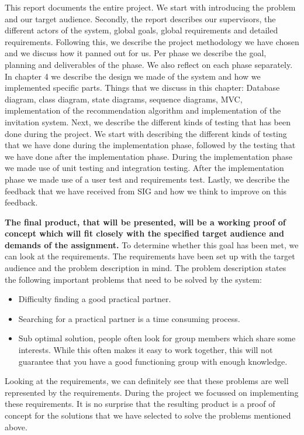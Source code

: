 This report documents the entire project.
We start with introducing the problem and our target audience.
Secondly, the report describes our supervisors, the different actors of the system, global goals, global requirements and detailed requirements.
Following this, we describe the project methodology we have chosen and we discuss how it panned out for us.
Per phase we describe the goal, planning and deliverables of the phase.
We also reflect on each phase separately.
In chapter 4 we describe the design we made of the system and how we implemented specific parts.
Things that we discuss in this chapter: Database diagram, class diagram, state diagrams, sequence diagrams, MVC, implementation of the recommendation algorithm and implementation of the invitation system.
Next, we describe the different kinds of testing that has been done during the project.
We start with describing the different kinds of testing that we have done during the implementation phase, followed by the testing that we have done after the implementation phase.
During the implementation phase we made use of unit testing and integration testing.
After the implementation phase we made use of a user test and requirements test.
Lastly, we describe the feedback that we have received from SIG and how we think to improve on this feedback.

\textbf{The final product, that will be presented, will be a working proof of concept which will fit closely with the specified target audience and demands of the assignment.}
To determine whether this goal has been met, we can look at the requirements.
The requirements have been set up with the target audience and the problem description in mind.
The problem description states the following important problems that need to be solved by the system:
\begin{itemize}
\item Difficulty finding a good practical partner.
\item Searching for a practical partner is a time consuming process.
\item Sub optimal solution, people often look for group members which share some interests.
While this often makes it easy to work together, this will not guarantee that you have a good functioning group with enough knowledge.
\end{itemize}

Looking at the requirements, we can definitely see that these problems are well represented by the requirements.
During the project we focussed on implementing these requirements.
It is no surprise that the resulting product is a proof of concept for the solutions that we have selected to solve the problems mentioned above.


